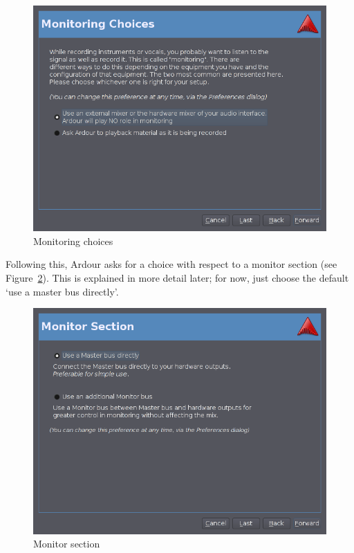 \documentclass{book}
\begin{document}
\begin{figure}[ht]
\begin{center}
\includegraphics[scale=0.5]{screenshots/monitoring-choices.png}
\end{center}
\caption{Monitoring choices}
\label{fig:monitoring-choices}
\end{figure}

Following this, Ardour asks for a choice with respect to a monitor
section (see Figure~\ref{fig:monitor-section}).  This is explained in
more detail later; for now, just choose the default `use a master bus
directly'.

\begin{figure}[ht]
\begin{center}
\includegraphics[scale=0.5]{screenshots/monitor-section.png}
\end{center}
\caption{Monitor section}
\label{fig:monitor-section}
\end{figure}
\end{document}
